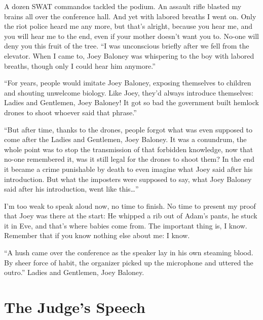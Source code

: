 \documentclass[oneside]{book}
\begin{document}
A dozen SWAT commandos tackled the podium.
An assault rifle blasted my brains all over the conference hall.
And yet with labored breaths I went on.
Only the riot police heard me any more, but that's alright,
because you hear me, and you will hear me to the end, even if your mother
doesn't want you to.  No-one will deny you this fruit of the tree.
``I was unconscious briefly after we fell from the elevator.
When I came to, Joey Baloney was whispering to the boy with labored breaths,
though only I could hear him anymore.''

``For years, people would imitate Joey Baloney, exposing themselves to children
and shouting unwelcome biology.  Like Joey, they'd always introduce themselves:
Ladies and Gentlemen, Joey Baloney!  It got so bad the government built
hemlock drones to shoot whoever said that phrase.''

``But after time, thanks to the drones, people forgot what was even supposed to come
after the Ladies and Gentlemen, Joey Baloney.  It was a conundrum, the
whole point was to stop the transmission of that forbidden knowledge,
now that no-one remembered it, was it still legal for the drones to shoot them?
In the end it became a crime punishable by death to even imagine what Joey
said after his introduction.
But what the imposters were supposed to say, what Joey Baloney said after his
introduction, went like this\ldots''

I'm too weak to speak aloud now, no time to finish.
No time to present my proof that Joey was there at the start:
He whipped a rib out of Adam's pants, he stuck it in Eve, and that's where
babies come from.  The important thing is, I know.
Remember that if you know nothing else about me: I know.

``A hush came over the conference as the speaker lay in his own steaming blood.
By sheer force of habit, the organizer picked up the microphone and uttered the
outro.''  Ladies and Gentlemen, Joey Baloney.


\chapter{The Judge's Speech}
\end{document}
